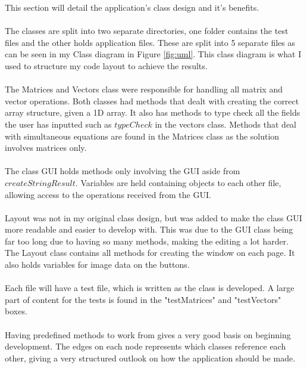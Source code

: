 \documentclass[final]{cmpreport}
\begin{document}
	This section will detail the application's class design and it's benefits.\\
	\\The classes are split into two separate directories, one folder contains the test files and the other holds application files. These are split into 5 separate files as can be seen in my Class diagram in Figure \ref{fig:uml}. This class diagram is what I used to structure my code layout to achieve the results.\\
	\\The Matrices and Vectors class were responsible for handling all matrix and vector operations. Both classes had methods that dealt with creating the correct array structure, given a 1D array. It also has methods to type check all the fields the user has inputted such as $typeCheck$ in the vectors class. Methods that deal with simultaneous equations are found in the Matrices class as the solution involves matrices only.\\
	\\The class GUI holds methods only involving the GUI aside from $createStringResult$. Variables are held containing objects to each other file, allowing access to the operations received from the GUI.\\
	\\Layout was not in my original class design, but was added to make the class GUI more readable and easier to develop with. This was due to the GUI class being far too long due to having so many methods, making the editing a lot harder. The Layout class contains all methods for creating the window on each page. It also holds variables for image data on the buttons. \\
	\\Each file will have a test file, which is written as the class is developed. A large part of content for the tests is found in the "testMatrices" and "testVectors" boxes.\\
	\\Having predefined methods to work from gives a very good basis on beginning development. The edges on each node represents which classes reference each other, giving a very structured outlook on how the application should be made.
\end{document}
